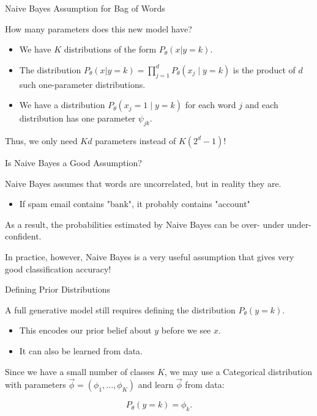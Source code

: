 \documentclass[../../generative_classifiers.tex]{subfiles}
\begin{document}
\begin{frame}[fragile]{Naive Bayes Assumption for Bag of Words}

How many parameters does this new model have?

\begin{itemize}
    \item We have $K$ distributions of the form $P_\theta(x|y=k)$.
    \item The distribution $P_\theta(x|y=k) = \prod_{j=1}^d P_\theta(x_j \mid y=k)$ is the product of $d$ such one-parameter distributions.
    \item We have a distribution $P_\theta(x_j = 1 \mid y=k)$ for each word $j$ and each distribution has one parameter $\psi_{jk}$.
\end{itemize}

Thus, we only need $Kd$ parameters instead of $K(2^d-1)$!

\end{frame}

\begin{frame}[fragile]{Is Naive Bayes a Good Assumption?}



Naive Bayes assumes that words are uncorrelated, but in reality they are.
  \begin{itemize}
      \item If spam email contains "bank", it probably contains "account"
  \end{itemize}

As a result, the probabilities estimated by Naive Bayes can be over- under under-confident.

\vspace{0.2cm}

In practice, however, Naive Bayes is a very useful assumption that gives very good classification accuracy!



\end{frame}
\begin{frame}[fragile]{Defining Prior Distributions }


A full generative model still requires defining the distribution $P_\theta(y=k)$.

\begin{itemize}
    \item This encodes our prior belief about $y$ before we see $x$.
    \item It can also be learned from data.
\end{itemize}

\vspace{0.2cm}


Since we have a small number of classes $K$, we may use a Categorical distribution with parameters $\vec\phi = (\phi_1,...,\phi_K)$ and learn $\vec\phi$ from data:

$$ P_\theta(y=k) = \phi_k.$$

\end{frame}
\end{document}
